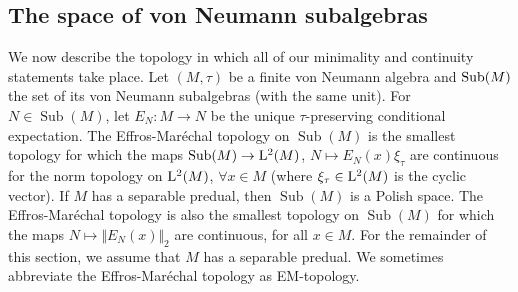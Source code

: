 \documentclass[12pt]{amsart} %
\theoremstyle{plain}
\theoremstyle{definition}
\DeclareMathOperator{\Sub}{Sub}
\begin{document}
\subsection{The space of von Neumann subalgebras}
We now describe the topology in which all of our minimality and continuity statements take place.
Let $(M,\tau)$ be a finite von Neumann algebra and ${\rm Sub}(M)$ the set of its von Neumann subalgebras (with the same unit). For $N\in\Sub(M)$, let $E_N:M\rightarrow N$ be the unique $\tau$-preserving conditional expectation. The Effros-Mar\'echal topology on $\Sub(M)$ is the smallest topology for which the maps $\Sub(M)\rightarrow{\rm L}^2(M)$, $N\mapsto E_N(x)\xi_\tau$ are continuous for the norm topology on ${\rm L}^2(M)$, $\forall x\in M$ (where $\xi_\tau\in{\rm L}^2(M)$ is the cyclic vector). If $M$ has a separable predual, then $\Sub(M)$ is a Polish space. The Effros-Mar\'echal topology is also the smallest topology on $\Sub(M)$ for which the maps $N\mapsto\Vert E_N(x)\Vert_2$ are continuous, for all $x\in M$. For the remainder of this section, we assume that $M$ has a separable predual. We sometimes abbreviate the Effros-Mar\'echal topology as EM-topology.
\end{document}
